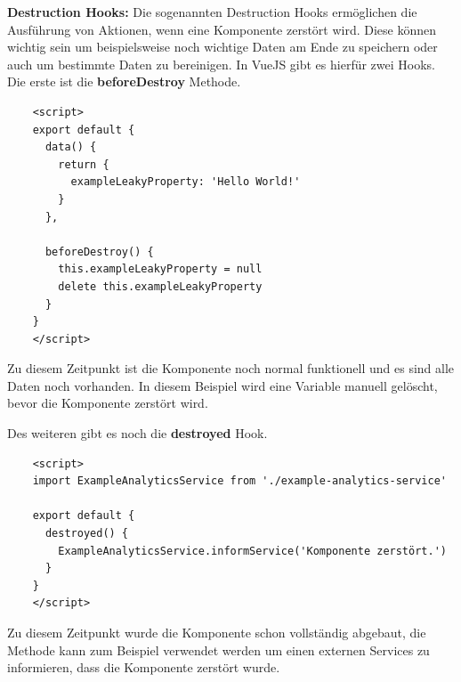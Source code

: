 \textbf{Destruction Hooks:}
\newline
Die sogenannten Destruction Hooks ermöglichen die Ausführung von Aktionen, wenn eine Komponente zerstört wird. Diese können wichtig sein um beispielsweise noch wichtige Daten am Ende zu speichern oder auch um bestimmte Daten zu bereinigen.
In VueJS gibt es hierfür zwei Hooks. Die erste ist die \textbf{beforeDestroy} Methode.

\begin{lstlisting}
    <script>
    export default {
      data() {
        return {
          exampleLeakyProperty: 'Hello World!'
        }
      },
    
      beforeDestroy() {
        this.exampleLeakyProperty = null
        delete this.exampleLeakyProperty
      }
    }
    </script>
\end{lstlisting}

Zu diesem Zeitpunkt ist die Komponente noch normal funktionell und es sind alle Daten noch vorhanden. In diesem Beispiel wird eine Variable manuell gelöscht, bevor die Komponente zerstört wird.

Des weiteren gibt es noch die \textbf{destroyed} Hook.

\begin{lstlisting}
    <script>
    import ExampleAnalyticsService from './example-analytics-service'
    
    export default {
      destroyed() {
        ExampleAnalyticsService.informService('Komponente zerstört.')
      }
    }
    </script>
\end{lstlisting}

Zu diesem Zeitpunkt wurde die Komponente schon vollständig abgebaut,  die Methode kann zum Beispiel verwendet werden um einen externen Services zu informieren, dass die Komponente zerstört wurde.

\cite{frontend_web_vuejs_lifecycle}